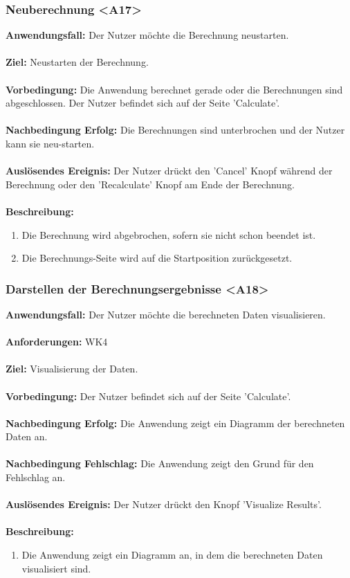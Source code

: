 \documentclass[parskip=full]{scrartcl} %
\begin{document}
\subsubsection*{Neuberechnung <A17>}
\textbf{Anwendungsfall:}  Der Nutzer möchte die Berechnung neustarten.\\\\
\textbf{Ziel:} Neustarten der Berechnung.\\\\
\textbf{Vorbedingung:} Die Anwendung berechnet gerade oder die Berechnungen sind abgeschlossen. Der Nutzer befindet sich auf der Seite 'Calculate'.\\\\
\textbf{Nachbedingung Erfolg:} Die Berechnungen sind unterbrochen und der Nutzer kann sie neu-starten.\\\\
\textbf{Auslösendes Ereignis:} Der Nutzer drückt den 'Cancel' Knopf während der Berechnung oder den 'Recalculate' Knopf am Ende der Berechnung.\\\\
\textbf{Beschreibung:}
\begin{enumerate}
    \item Die Berechnung wird abgebrochen, sofern sie nicht schon beendet ist.
    \item Die Berechnungs-Seite wird auf die Startposition zurückgesetzt.
\end{enumerate}
\newpage



\subsubsection*{Darstellen der Berechnungsergebnisse <A18>}
\textbf{Anwendungsfall:} Der Nutzer möchte die berechneten Daten visualisieren.\\\\
\textbf{Anforderungen:} WK4\\\\
\textbf{Ziel:} Visualisierung der Daten.\\\\
\textbf{Vorbedingung:}  Der Nutzer befindet sich auf der Seite 'Calculate'.\\\\
\textbf{Nachbedingung Erfolg:} Die Anwendung zeigt ein Diagramm der berechneten Daten an.\\\\
\textbf{Nachbedingung Fehlschlag:} Die Anwendung zeigt den Grund für den Fehlschlag an.\\\\
\textbf{Auslösendes Ereignis:} Der Nutzer drückt den Knopf 'Visualize Results'.\\\\
\textbf{Beschreibung:}
\begin{enumerate}
    \item Die Anwendung zeigt ein Diagramm an, in dem die berechneten Daten visualisiert sind.
\end{enumerate}
\newpage
\end{document}

